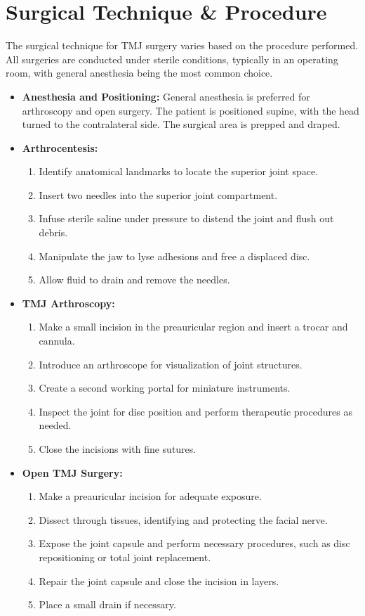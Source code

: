 \section*{Surgical Technique \& Procedure}
The surgical technique for TMJ surgery varies based on the procedure performed. All surgeries are conducted under sterile conditions, typically in an operating room, with general anesthesia being the most common choice.

\begin{itemize}
  \item \textbf{Anesthesia and Positioning:} General anesthesia is preferred for arthroscopy and open surgery. The patient is positioned supine, with the head turned to the contralateral side. The surgical area is prepped and draped.

  \item \textbf{Arthrocentesis:}
    \begin{enumerate}
      \item Identify anatomical landmarks to locate the superior joint space.
      \item Insert two needles into the superior joint compartment.
      \item Infuse sterile saline under pressure to distend the joint and flush out debris.
      \item Manipulate the jaw to lyse adhesions and free a displaced disc.
      \item Allow fluid to drain and remove the needles.
    \end{enumerate}

  \item \textbf{TMJ Arthroscopy:}
    \begin{enumerate}
      \item Make a small incision in the preauricular region and insert a trocar and cannula.
      \item Introduce an arthroscope for visualization of joint structures.
      \item Create a second working portal for miniature instruments.
      \item Inspect the joint for disc position and perform therapeutic procedures as needed.
      \item Close the incisions with fine sutures.
    \end{enumerate}

  \item \textbf{Open TMJ Surgery:}
    \begin{enumerate}
      \item Make a preauricular incision for adequate exposure.
      \item Dissect through tissues, identifying and protecting the facial nerve.
      \item Expose the joint capsule and perform necessary procedures, such as disc repositioning or total joint replacement.
      \item Repair the joint capsule and close the incision in layers.
      \item Place a small drain if necessary.
    \end{enumerate}
\end{itemize}


